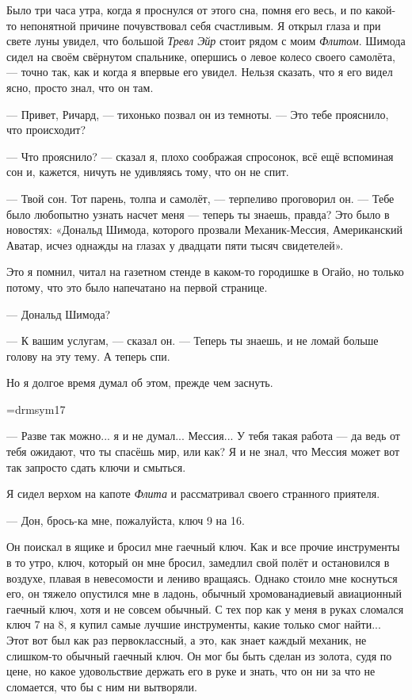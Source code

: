 Было три часа утра, когда я проснулся от этого сна, помня его весь, и по какой-то непонятной
причине почувствовал себя счастливым. Я открыл глаза и при свете луны увидел, что большой
{\it Тревл Эйр\/} стоит рядом с моим {\it Флитом}. Шимода сидел на своём свёрнутом спальнике, опершись о левое колесо своего самолёта, --- точно так, как и когда я впервые его увидел. Нельзя сказать, что я его видел ясно, просто знал, что он там.

--- Привет, Ричард, --- тихонько позвал он из темноты. --- Это тебе прояснило, что происходит?

--- Что прояснило? --- сказал я, плохо соображая спросонок, всё ещё вспоминая сон и, кажется, ничуть не удивляясь тому, что он не спит.

--- Твой сон. Тот парень, толпа и самолёт, --- терпеливо проговорил он. --- Тебе было любопытно узнать насчет меня --- теперь ты знаешь, правда? Это было в новостях: «Дональд Шимода, которого прозвали Механик-Мессия, Американский Аватар, исчез однажды на глазах у двадцати пяти тысяч свидетелей».

Это я помнил, читал на газетном стенде в каком-то городишке в Огайо, но только потому, что это было напечатано на первой странице.

--- Дональд Шимода?

--- К вашим услугам, --- сказал он. --- Теперь ты знаешь, и не ломай больше голову на эту тему. А теперь спи.

Но я долгое время думал об этом, прежде чем заснуть.

\vskip15pt
\hbox{\kern5cm\font\sym=drmsym17 \sym {}}
\vskip20pt

--- Разве так можно... я и не думал... Мессия... У тебя такая работа --- да ведь от тебя ожидают, что ты спасёшь мир, или как? Я и не знал, что Мессия может вот так запросто сдать ключи и смыться.

Я сидел верхом на капоте {\it Флита\/} и рассматривал своего странного приятеля.

--- Дон, брось-ка мне, пожалуйста, ключ 9 на 16.

Он поискал в ящике и бросил мне гаечный ключ. Как и все прочие инструменты в то утро, ключ, который он мне бросил, замедлил свой полёт и остановился в воздухе, плавая в невесомости и лениво вращаясь. Однако стоило мне коснуться его, он тяжело опустился мне в ладонь, обычный хромованадиевый авиационный гаечный ключ, хотя и не совсем обычный. С тех пор как у меня в руках сломался ключ 7 на 8, я купил самые лучшие инструменты, какие только смог найти... Этот вот был как раз первоклассный, а это, как знает каждый механик, не слишком-то обычный гаечный ключ. Он мог бы быть сделан из золота, судя по цене, но какое удовольствие держать его в руке и знать, что он ни за что не сломается, что бы с ним ни вытворяли.

